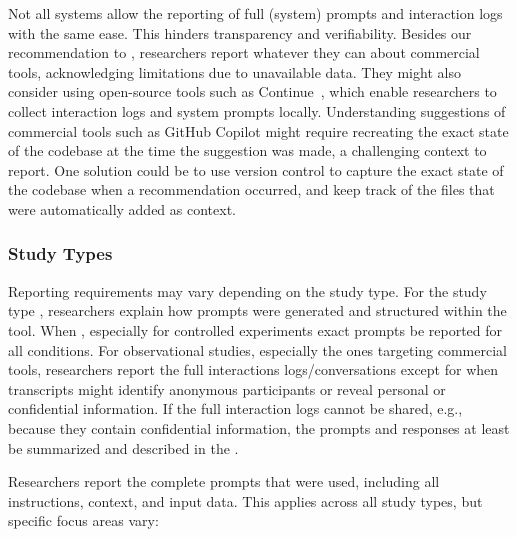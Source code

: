 Not all systems allow the reporting of full (system) prompts and interaction logs with the same ease.
This hinders transparency and verifiability.
Besides our recommendation to \openllm, researchers \must report whatever they can about commercial tools, acknowledging limitations due to unavailable data.
They might also consider using open-source tools such as Continue~\cite{continue.dev}, which enable researchers to collect interaction logs and system prompts locally.
Understanding suggestions of commercial tools such as GitHub Copilot might require recreating the exact state of the codebase at the time the suggestion was made, a challenging context to report.
One solution could be to use version control to capture the exact state of the codebase when a recommendation occurred, and keep track of the files that were automatically added as context.


\subsubsection{Study Types}

Reporting requirements may vary depending on the study type.
For the study type \newtools, researchers \must explain how prompts were generated and structured within the tool.
When \llmusage, especially for controlled experiments exact prompts \must be reported for all conditions.
For observational studies, especially the ones targeting commercial tools, researchers \must report the full interactions logs/conversations except for when transcripts might identify anonymous participants or reveal personal or confidential information.
If the full interaction logs cannot be shared, e.g., because they contain confidential information, the prompts and responses \must at least be summarized and described in the \paper.

Researchers \must report the complete prompts that were used, including all instructions, context, and input data. This applies across all study types, but specific focus areas vary:

